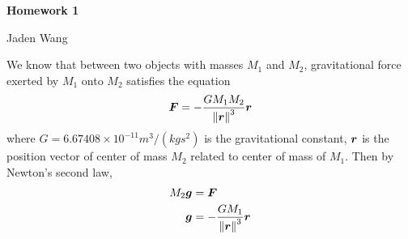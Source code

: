 \documentclass[12pt]{article}
\begin{document}
\centerline {\textsf{\textbf{\LARGE{Homework 1}}}}
\centerline {Jaden Wang}
\vspace{.15in}

We know that between two objects with masses $ M_1$ and $ M_2$, gravitational force exerted by $ M_1$ onto $ M_2$ satisfies the equation
\begin{align*}
	{\bm{ F}}  =- \frac{G M_1 M_2}{ {\left\lVert{ {\bm{ r}} }\right\rVert} ^3} {\bm{ r}} 
\end{align*}
where $ G = 6.67408 \times 10^{-11} m ^3 /(kg s ^2)$ is the gravitational constant, $ {\bm{ r}} $ is the position vector of center of mass $ M_2$ related to center of mass of $ M_1$. Then by Newton's second law,
\begin{align*}
	M_2{\bm{ g}} &= {\bm{ F}} \\ 
	{\bm{ g}} &= - \frac{G M_1}{ {\left\lVert{ {\bm{ r}} }\right\rVert} ^3 } {\bm{ r}}   
\end{align*}
\end{document}
